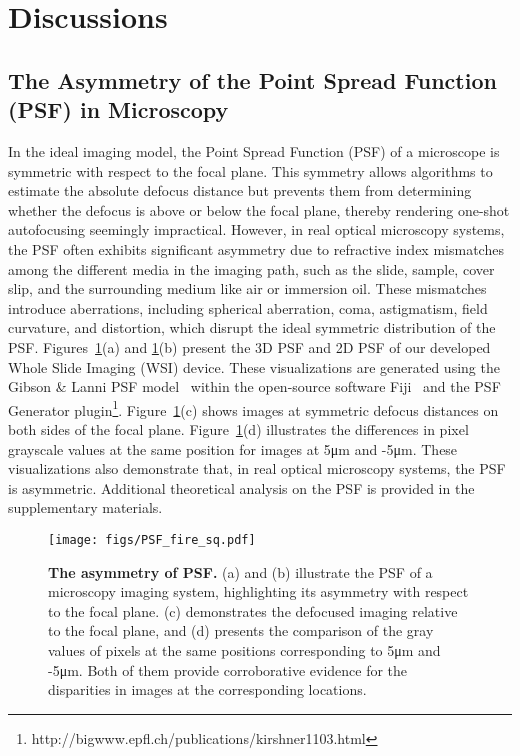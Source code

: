 \section{Discussions}

\subsection{The Asymmetry of the Point Spread Function (PSF) in Microscopy}

In the ideal imaging model, the Point Spread Function (PSF) of a microscope is symmetric with respect to the focal plane. 
This symmetry allows algorithms to estimate the absolute defocus distance but prevents them from determining whether the defocus is above or below the focal plane, thereby rendering one-shot autofocusing seemingly impractical.
However, in real optical microscopy systems, the PSF often exhibits significant asymmetry due to refractive index mismatches among the different media in the imaging path, such as the slide, sample, cover slip, and the surrounding medium like air or immersion oil. 
These mismatches introduce aberrations, including spherical aberration, coma, astigmatism, field curvature, and distortion, which disrupt the ideal symmetric distribution of the PSF. 
Figures~\ref{fig:psf}(a) and \ref{fig:psf}(b) present the 3D PSF and 2D PSF of our developed Whole Slide Imaging (WSI) device.
These visualizations are generated using the Gibson \& Lanni PSF model~\cite{Gibson:89} within the open-source software Fiji~\cite{Schindelin2012-jh} and the PSF Generator plugin\footnote{http://bigwww.epfl.ch/publications/kirshner1103.html}.
Figure~\ref{fig:psf}(c) shows images at symmetric defocus distances on both sides of the focal plane.
Figure~\ref{fig:psf}(d) illustrates the differences in pixel grayscale values at the same position for images at 5\si{\micro\meter} and -5\si{\micro\meter}.
These visualizations also demonstrate that, in real optical microscopy systems, the PSF is asymmetric.
Additional theoretical analysis on the PSF is provided in the supplementary materials.

\begin{figure}[H]
	\centering
	\texttt{[image: figs/PSF\_fire\_sq.pdf]}
	\caption{\textbf{The asymmetry of PSF.} (a) and (b) illustrate the PSF of a microscopy imaging system, highlighting its asymmetry with respect to the focal plane. (c) demonstrates the defocused imaging relative to the focal plane, and (d) presents the comparison of the gray values of pixels at the same positions corresponding to 5\si{\micro\meter} and -5\si{\micro\meter}. Both of them provide corroborative evidence for the disparities in images at the corresponding locations.}
	\label{fig:psf}
\end{figure}

